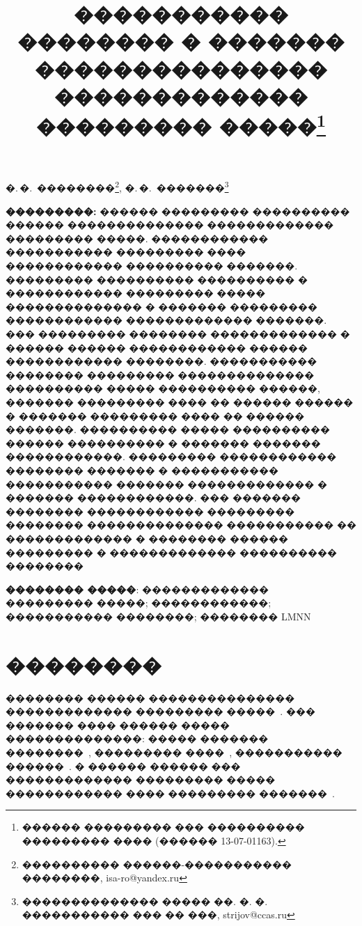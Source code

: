 \documentclass[12pt,twoside, notitlepage]{article}
\begin{document}
\title
    {����������� �������� � ������� ��������������� ������������� ��������� �����\thanks{������ ��������� ��� ���������� ��������� ���� (������ 13-07-01163).}}
\date{}
\maketitle
\begin{center}
    �.\,�.~��������\footnote{���������� ������-����������� ��������, isa-ro@yandex.ru},
    �.\,�.~�������\footnote{�������������� ����� ��. �. �. ����������� ��� �� ���, strijov@ccas.ru}
\end{center}
    \textbf{���������:} ������ ��������� ���������� ������ �������������� ������������� ��������� �����.
    ������������ ����������� ��������� ���� ������������ ���������� �������.
    ��������� ���������� ���������� � ������������ ��������� ����� �������������� � ������� ��������� ������������ ������������� �������.
    ��� ��������� �������� ������������� � ������ ������ ������������ ������ ������������ ��������.
    ����������� �������� ��������� �������������� ���������� ����� ���������� ������, ������� ��������� ���� �� ������ ������ � ������� ��������� ���� �� ������ �������.
    ���������� ����� ���������� ������ ���������� � ������� ������� ������������.
    ��������� ������������ �������� ������� � ����������� ����������� ������� ������������� � ������� ������������.
    ��� ������� �������� ������������ ��������� �������� �������������� ����������� �� ������������� � �������� ������ ��������� � ������������� ���������� ��������

\bigskip
\textbf{�������� �����}: ������������� ��������� �����; ������������; ����������� ��������; �������� LMNN
\section{��������}
�������� ������ ��������������� ������������� ��������� �����~\cite{popova2015multiclass, ignatov2015multiclass}.
��� ������� ���� ������ ����� ��������������: ����� ������� ��������~\cite{guler2007mccsvm, ubeyli2007mccsvm2}, ��������� ����~\cite{anand1995mccnn}, ����������� ������~\cite{kafai2012mccbn}.
� ������ ������ ��� ������������� ��������� ����� ������������ ���� ��������� �������~\cite{chaovalitwongse2007knn}.
\end{document}
